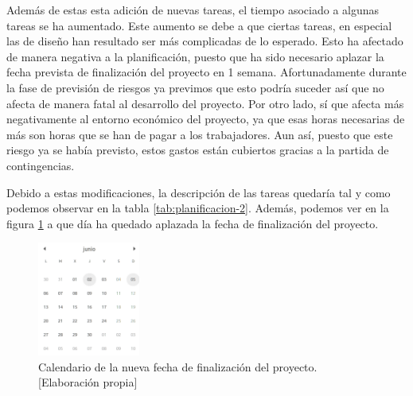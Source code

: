 Además de estas esta adición de nuevas tareas, el tiempo asociado a algunas tareas se ha aumentado. Este aumento se debe a que ciertas tareas, en especial las de diseño han resultado ser más complicadas de lo esperado. Esto ha afectado de manera negativa a la planificación, puesto que ha sido necesario aplazar la fecha prevista de finalización del proyecto en 1 semana. Afortunadamente durante la fase de previsión de riesgos ya previmos que esto podría suceder así que no afecta de manera fatal al desarrollo del proyecto. Por otro lado, sí que afecta más negativamente al entorno económico del proyecto, ya que esas horas necesarias de más son horas que se han de pagar a los trabajadores. Aun así, puesto que este riesgo ya se había previsto, estos gastos están cubiertos gracias a la partida de contingencias.

Debido a estas modificaciones, la descripción de las tareas quedaría tal y como podemos observar en la tabla \ref {tab:planificacion-2}. Además, podemos ver en la figura \ref {fig:calendario-2} a que día ha quedado aplazada la fecha de finalización del proyecto.


\begin{figure}[ht]
    \centering
    \includegraphics[width=0.3\textwidth]{img/calendario-2.png}
    \caption{Calendario de la nueva fecha de finalización del proyecto. [Elaboración propia]}
    \label{fig:calendario-2}
\end{figure}


